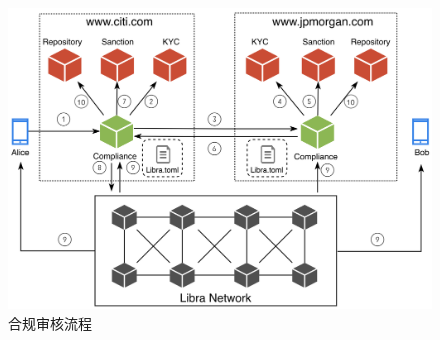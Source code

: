 \begin{figure}[h!]
    \centering
    \includegraphics[width=12cm, keepaspectratio]{images/compliance.png}
    \caption{合规审核流程}
    \label{fig:compliance}
\end{figure}
